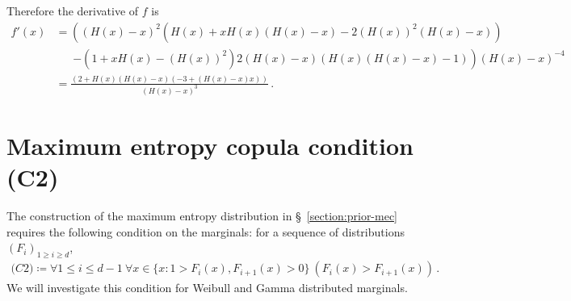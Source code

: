 \documentclass{article}
\begin{document}
%
Therefore the derivative of $f$ is
%
\begin{align*}
	f'(x) &= \left(\left(H(x) - x\right) ^ 2
		\left(H(x) + x H(x) \left(H(x) - x \right)
		- 2 (H(x)) ^ 2 \left(H(x) - x \right)\right)\right. \\
	&\ \phantom{=} \left. - \left(1 + x H(x) - (H(x)) ^ 2\right)
		2 \left(H(x) - x\right) \left(H(x) \left(H(x) - x \right) - 1\right)\right)
		\left(H(x) - x\right) ^ {-4} \\
	&= \frac{(2 + H(x) (H(x) - x) (-3 + (H(x) - x) x))}{(H(x) - x) ^ 3} \,.
\end{align*}
%
%
\section{Maximum entropy copula condition (C2)}
\label{section:C2}
%

%
The construction of the maximum entropy distribution in
\S~\ref{section:prior-mec} requires the following condition on the marginals:
for a sequence of distributions $(F_i)_{1 \geq i \geq d}$,
%
\begin{align*}
	\textit{(C2)} \coloneqq \forall 1 \leq i \leq d - 1
		\ \forall x \in \{x \colon 1 > F_i(x), F_{i + 1}(x) > 0\}
		\ (F_i(x) > F_{i + 1}(x))\,.
\end{align*}
%
We will investigate this condition for Weibull and Gamma distributed marginals.
%
\end{document}
